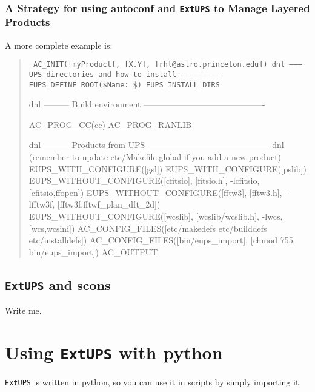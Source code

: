 \documentclass{article}
\newcommand{\code}[1]{\texttt{#1}}
\newcommand{\eups}{\code{ExtUPS}}
\begin{document}
\subsubsection{A Strategy for using autoconf and \eups{} to Manage Layered Products}


A more complete example is:

\begin{quote}
    \obeylines\tt\small\parskip=0pt
AC\_INIT([myProduct], [X.Y], [rhl@astro.princeton.edu])
\vspace{5pt}
dnl --------- UPS directories and how to install --------------------------
\vspace{5pt}
EUPS\_DEFINE\_ROOT(\${Name}:  \$)
EUPS\_INSTALL\_DIRS   
\vspace{5pt}

dnl --------- Build environment -------------------------------------------

AC\_PROG\_CC(cc)
AC\_PROG\_RANLIB

dnl --------- Products from UPS -------------------------------------------
dnl (remember to update etc/Makefile.global if you add a new product)
\vspace{5pt}
EUPS\_WITH\_CONFIGURE([gsl])
EUPS\_WITH\_CONFIGURE([pslib])
\vspace{5pt}
EUPS\_WITHOUT\_CONFIGURE([cfitsio], [fitsio.h],
                        -lcfitsio, [cfitsio,ffopen])
EUPS\_WITHOUT\_CONFIGURE([fftw3],   [fftw3.h],
                        -lfftw3f,  [fftw3f,fftwf\_plan\_dft\_2d])
EUPS\_WITHOUT\_CONFIGURE([wcslib],  [wcslib/wcslib.h],
                        -lwcs,     [wcs,wcsini])
\vspace{5pt}
AC\_CONFIG\_FILES([etc/makedefs etc/builddefs etc/installdefs])
AC\_CONFIG\_FILES([bin/eups\_import], [chmod 755 bin/eups\_import])
\vspace{5pt}
AC\_OUTPUT
\end{quote}

\subsection{\eups{} and scons}
\label{scons}

Write me.

\section{Using \eups{} with python}

\eups{} is written in python, so you can use it in scripts by simply importing it.
\end{document}
